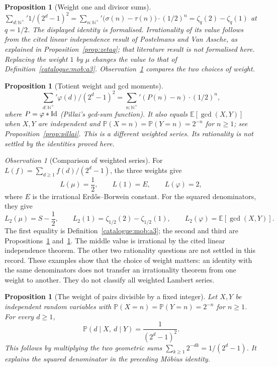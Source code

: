 \documentclass[11pt]{article}
\theoremstyle{plain}
\newtheorem{prop}[thm]{Proposition}
\theoremstyle{definition}
\theoremstyle{remark}
\newtheorem{obs}[thm]{Observation}
\let\origmathrm\mathrm
\renewcommand{\mathrm}[1]{\ifmmode\origmathrm{#1}\else\textrm{#1}\fi}%
\begin{document}
\begin{prop}[Weight one and divisor sums]\label{catalogue:mob:a4}
$\sum_{d:\mathbb{N}^+}' 1/(2^d-1)^2 = \sum_{n:\mathbb{N}^+}' \big(\sigma(n)-\tau(n)\big)\cdot(1/2)^n = \zeta_q(2) - \zeta_q(1)$ at $q=1/2$. The displayed identity is formalised. Irrationality of its value follows
from the cited linear independence result of Postelmans and Van Assche,
as explained in Proposition~\ref{prop:zetaq}; that literature result is
not formalised here. Replacing the weight $1$ by $\mu$ changes the value
to that of Definition~\ref{catalogue:mob:a3}. Observation~\ref{catalogue:mob:a6}
compares the two choices of weight.
\end{prop}

\begin{prop}[Totient weight and gcd moments]\label{catalogue:mob:a5}
\[
\sum_{d:\mathbb{N}^+}' \varphi(d)/(2^d-1)^2 = \sum_{n:\mathbb{N}^+}' (P(n)-n)\cdot(1/2)^n,
\]
where $P = \varphi * \mathrm{Id}$ (Pillai's gcd-sum function). It also equals $\mathbb E[\gcd(X,Y)]$ when $X,Y$ are independent and
$\mathbb P(X=n)=\mathbb P(Y=n)=2^{-n}$ for $n\ge1$; see
Proposition~\ref{prop:pillai}.
This is a different weighted series. Its rationality is not settled by
the identities proved here.
\end{prop}

\begin{obs}[Comparison of weighted series]\label{catalogue:mob:a6}
For $L(f)=\sum_{d\ge1}f(d)/(2^d-1)$, the three weights give
\[
 L(\mu)=\frac12,\qquad L(1)=E,\qquad L(\varphi)=2,
\]
where $E$ is the irrational Erd\H{o}s--Borwein constant.
For the squared denominators, they give
\[
 L_2(\mu)=S-\frac12,\qquad
 L_2(1)=\zeta_{1/2}(2)-\zeta_{1/2}(1),\qquad
 L_2(\varphi)=\mathbb E[\gcd(X,Y)].
\]
The first equality is Definition~\ref{catalogue:mob:a3}; the second and
third are Propositions~\ref{catalogue:mob:a4} and~\ref{catalogue:mob:a5}.
The middle value is irrational by the cited linear independence theorem.
The other two rationality questions are not settled in this record.
These examples show that the choice of weight matters: an identity with
the same denominators does not transfer an irrationality theorem from one
weight to another. They do not classify all weighted Lambert series.
\end{obs}

\begin{prop}[The weight of pairs divisible by a fixed integer]\label{catalogue:mob:a7}
Let $X,Y$ be independent random variables with
$\mathbb P(X=n)=\mathbb P(Y=n)=2^{-n}$ for $n\ge1$. For every $d\ge1$,
\[
 \mathbb P(d\mid X,\ d\mid Y)=\frac1{(2^d-1)^2}.
\]
This follows by multiplying the two geometric sums
$\sum_{k\ge1}2^{-dk}=1/(2^d-1)$. It explains the squared denominator
in the preceding M\"obius identity.
\end{prop}
\end{document}
